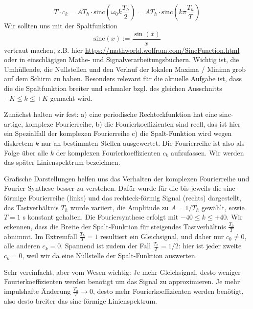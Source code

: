 \begin{Loesung}
%
\begin{equation}
\label{eq:D1483A84E2_Loesung}
T \cdot c_k = A T_h \cdot \mathrm{sinc}(\omega_0 k \frac{T_h}{2}) = A T_h \cdot \mathrm{sinc}(k \pi \frac{T_h}{T})
\end{equation}
%
Wir sollten uns mit der Spaltfunktion
\begin{equation}
\mathrm{sinc}(x) := \frac{\sin(x)}{x}
\end{equation}
vertraut machen, z.B.
hier \url{https://mathworld.wolfram.com/SincFunction.html} oder in einschlägigen
Mathe- und Signalverarbeitungsbüchern. Wichtig ist, die Umhüllende, die Nullstellen
und den Verlauf der lokalen Maxima / Minima grob auf dem Schirm zu haben.
%
Besonders relevant für die aktuelle Aufgabe ist, dass die die Spaltfunktion
breiter und schmaler bzgl. des gleichen Ausschnitts
$-K \leq k \leq +K$ gemacht wird.

Zunächst halten wir fest: a) eine periodische Rechteckfunktion hat eine sinc-artige,
komplexe Fourierreihe, b) die Fourierkoeffizienten sind reell, das ist
hier ein Spezialfall der komplexen Fourierreihe c) die Spalt-Funktion wird
wegen diskretem $k$ nur an bestimmten Stellen ausgewertet.
Die Fourierreihe ist also als Folge
über alle $k$ der komplexen Fourierkoeffizienten $c_k$ aufzufassen. Wir werden
das später Linienspektrum bezeichnen.

Grafische Darstellungen helfen uns das Verhalten der komplexen Fourierreihe und
Fourier-Synthese besser zu verstehen.
%
Dafür wurde für die  bis 
jeweils die sinc-förmige Fourierreihe (links) und das rechteck-förmig Signal
(rechts) dargestellt, das Tastverhältnis $T_h$ wurde
variiert, die Amplitude zu $A = 1/T_h$ gewählt, sowie $T=1$ s konstant gehalten.
%
Die Fouriersynthese erfolgt mit $-40 \leq k \leq +40$.
%
Wir erkennen, dass die Breite der Spalt-Funktion für steigendes Tastverhältnis
$\frac{T_h}{T}$ abnimmt.
%
Im Extremfall $\frac{T_h}{T} = 1$ resultiert ein Gleichsignal, und daher
nur $c_0 \neq 0$, alle anderen $c_k=0$.
%
Spannend ist zudem der Fall $\frac{T_h}{T} = 1/2$: hier ist jeder zweite $c_k=0$,
weil wir da eine Nullstelle der Spalt-Funktion auswerten.

Sehr vereinfacht, aber vom Wesen wichtig:
Je mehr Gleichsignal, desto weniger Fourierkoeffizienten werden benötigt um das
Signal zu approximieren. Je mehr impulshafte Änderung
$\frac{T_h}{T} \to  0$, desto mehr Fourierkoeffizienten werden benötigt, also
desto breiter das sinc-förmige Linienspektrum.
%


\end{Loesung}


